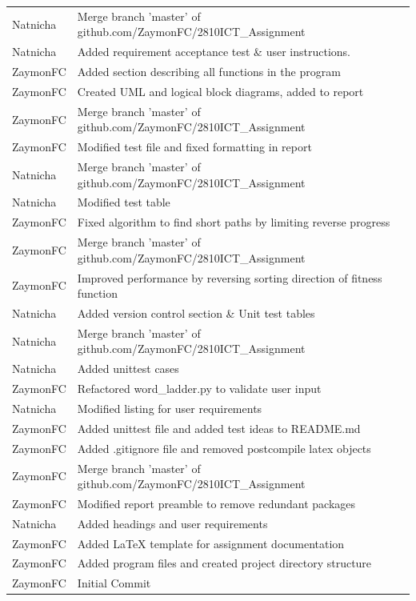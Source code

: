 \documentclass[12pt, a4]{report}
\begin{document}
		\begin{tabular}{ | p{2cm} | p{13cm} | }
				\hline
			Natnicha & Merge branch 'master' of github.com/ZaymonFC/2810ICT\_Assignment \\ 
			Natnicha & Added requirement acceptance test \& user instructions. \\ 
			ZaymonFC & Added section describing all functions in the program \\ 
			ZaymonFC & Created UML and logical block diagrams, added to report \\ 
			ZaymonFC & Merge branch 'master' of github.com/ZaymonFC/2810ICT\_Assignment \\ 
			ZaymonFC & Modified test file and fixed formatting in report \\ 
			Natnicha & Merge branch 'master' of github.com/ZaymonFC/2810ICT\_Assignment \\ 
			Natnicha & Modified test table \\ 
			ZaymonFC & Fixed algorithm to find short paths by limiting reverse progress \\ 
			ZaymonFC & Merge branch 'master' of github.com/ZaymonFC/2810ICT\_Assignment \\ 
			ZaymonFC & Improved performance by reversing sorting direction of fitness function \\ 
			Natnicha & Added version control section \& Unit test tables \\ 
			Natnicha & Merge branch 'master' of github.com/ZaymonFC/2810ICT\_Assignment \\ 
			Natnicha & Added unittest cases \\ 
			ZaymonFC & Refactored word\_ladder.py to validate user input \\ 
			Natnicha & Modified listing for user requirements \\ 
			ZaymonFC & Added unittest file and added test ideas to README.md \\ 
			ZaymonFC & Added .gitignore file and removed postcompile latex objects \\ 
			ZaymonFC & Merge branch 'master' of github.com/ZaymonFC/2810ICT\_Assignment \\ 
			ZaymonFC & Modified report preamble to remove redundant packages \\ 
			Natnicha & Added headings and user requirements \\ 
			ZaymonFC & Added LaTeX template for assignment documentation \\ 
			ZaymonFC & Added program files and created project directory structure \\ 
			ZaymonFC & Initial Commit \\ \hline
			
		\end{tabular}
		
\end{document}
